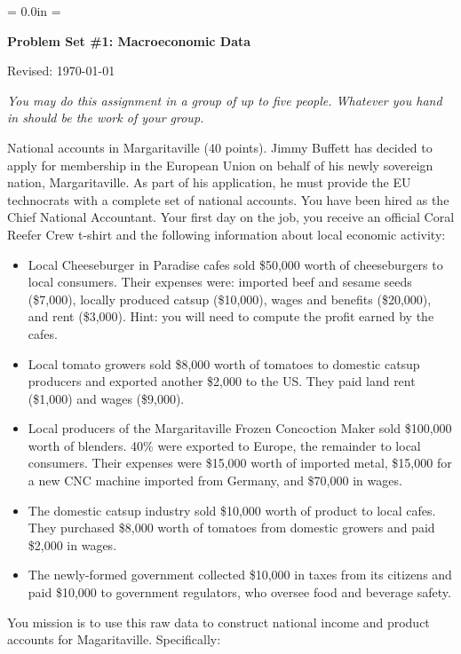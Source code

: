 \documentclass[12pt]{exam}
\def\HeadName{Problem Set \#1}
\begin{document}
\parindent = 0.0in
\parskip = \bigskipamount
\thispagestyle{empty}%
\Head

\centerline{\large \bf \HeadName: Macroeconomic Data}
\centerline{Revised:  \today}

\medskip
{\it You may do this assignment in a group of up to five people.
Whatever you hand in should be the work of your group.}

\begin{questions}
\question National accounts in Margaritaville (40 points).
Jimmy Buffett has decided to apply for membership in the European Union 
on behalf of his newly sovereign nation, Margaritaville. 
As part of his application, he must provide the EU
technocrats with a complete set of national accounts.  
You have been hired as the Chief National Accountant. 
Your first day on the job, 
you receive an official Coral Reefer Crew{\texttrademark} t-shirt
and the following information about local economic activity:
%
\begin{itemize}
\item Local Cheeseburger in Paradise{\texttrademark} cafes
sold \$50,000 worth of cheeseburgers to local consumers.  
Their expenses were:  imported beef and sesame seeds (\$7,000), 
locally produced catsup (\$10,000), 
wages and benefits (\$20,000), and rent (\$3,000).  
Hint: you will need to compute the profit earned by the cafes.  

\item Local tomato growers sold \$8,000 worth of tomatoes to domestic
catsup producers and exported another \$2,000 to the US.  
They paid land rent (\$1,000) and wages (\$9,000).  

\item Local producers of the Margaritaville Frozen Concoction Maker{\texttrademark }
sold \$100,000 worth of blenders.
40\% were exported to Europe, the remainder to local consumers.  
Their expenses were \$15,000 worth of imported metal, 
\$15,000 for a new CNC machine imported from Germany, 
and \$70,000 in wages.  

\item The domestic catsup industry sold \$10,000 worth of product to local 
cafes.  
They purchased \$8,000 worth of tomatoes from domestic growers 
and paid \$2,000 in wages.  


\item The newly-formed government collected \$10,000 in taxes from its citizens
and paid \$10,000 to government regulators, who oversee food and beverage safety.  
\end{itemize}
%
You mission is to use this raw data to construct 
national income and product accounts for Magaritaville.  
Specifically:
%
\begin{parts}

\end{parts}
\end{questions}
\end{document}
